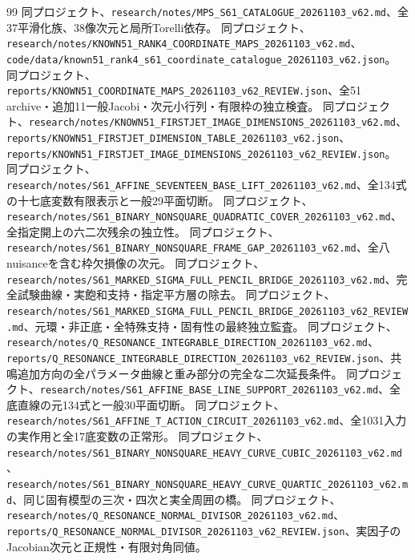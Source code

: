 \documentclass[11pt,a4paper]{ltjsarticle}
\theoremstyle{remark}
\begin{document}
\begin{thebibliography}{99}
 同プロジェクト、\nolinkurl{research/notes/MPS_S61_CATALOGUE_20261103_v62.md}、全37平滑化族、38像次元と局所Torelli依存。
 同プロジェクト、\nolinkurl{research/notes/KNOWN51_RANK4_COORDINATE_MAPS_20261103_v62.md}、\nolinkurl{code/data/known51_rank4_s61_coordinate_catalogue_20261103_v62.json}。
 同プロジェクト、\nolinkurl{reports/KNOWN51_COORDINATE_MAPS_20261103_v62_REVIEW.json}、全51 archive・追加11一般Jacobi・次元小行列・有限枠の独立検査。
 同プロジェクト、\nolinkurl{research/notes/KNOWN51_FIRSTJET_IMAGE_DIMENSIONS_20261103_v62.md}、\nolinkurl{reports/KNOWN51_FIRSTJET_DIMENSION_TABLE_20261103_v62.json}、\nolinkurl{reports/KNOWN51_FIRSTJET_IMAGE_DIMENSIONS_20261103_v62_REVIEW.json}。
 同プロジェクト、\nolinkurl{research/notes/S61_AFFINE_SEVENTEEN_BASE_LIFT_20261103_v62.md}、全134式の十七底変数有限表示と一般29平面切断。
 同プロジェクト、\nolinkurl{research/notes/S61_BINARY_NONSQUARE_QUADRATIC_COVER_20261103_v62.md}、全指定開上の六二次残余の独立性。
 同プロジェクト、\nolinkurl{research/notes/S61_BINARY_NONSQUARE_FRAME_GAP_20261103_v62.md}、全八nuisanceを含む枠欠損像の次元。
 同プロジェクト、\nolinkurl{research/notes/S61_MARKED_SIGMA_FULL_PENCIL_BRIDGE_20261103_v62.md}、完全試験曲線・実飽和支持・指定平方層の除去。
 同プロジェクト、\nolinkurl{research/notes/S61_MARKED_SIGMA_FULL_PENCIL_BRIDGE_20261103_v62_REVIEW.md}、元環・非正底・全特殊支持・固有性の最終独立監査。
 同プロジェクト、\nolinkurl{research/notes/Q_RESONANCE_INTEGRABLE_DIRECTION_20261103_v62.md}、\nolinkurl{reports/Q_RESONANCE_INTEGRABLE_DIRECTION_20261103_v62_REVIEW.json}、共鳴追加方向の全パラメータ曲線と重み部分の完全な二次延長条件。
 同プロジェクト、\nolinkurl{research/notes/S61_AFFINE_BASE_LINE_SUPPORT_20261103_v62.md}、全底直線の元134式と一般30平面切断。
 同プロジェクト、\nolinkurl{research/notes/S61_AFFINE_T_ACTION_CIRCUIT_20261103_v62.md}、全1031入力の実作用と全17底変数の正常形。
 同プロジェクト、\nolinkurl{research/notes/S61_BINARY_NONSQUARE_HEAVY_CURVE_CUBIC_20261103_v62.md}、\nolinkurl{research/notes/S61_BINARY_NONSQUARE_HEAVY_CURVE_QUARTIC_20261103_v62.md}、同じ固有模型の三次・四次と実全周囲の橋。
 同プロジェクト、\nolinkurl{research/notes/Q_RESONANCE_NORMAL_DIVISOR_20261103_v62.md}、\nolinkurl{reports/Q_RESONANCE_NORMAL_DIVISOR_20261103_v62_REVIEW.json}、実因子のJacobian次元と正規性・有限対角同値。
\end{thebibliography}
\endgroup
\end{document}
